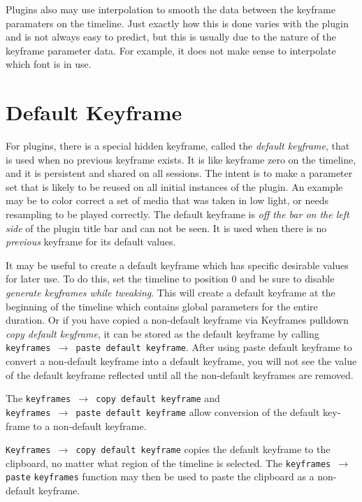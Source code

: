 Plugins also may use interpolation to smooth the data between the keyframe paramaters on the timeline.  Just exactly how this is done varies with the plugin and is not always easy to predict, but this
is usually due to the nature of the keyframe parameter data.  For example, it does not make sense to interpolate which font is in use.

\section{Default Keyframe}%
\label{sec:default_keyframe}

For plugins, there is a special hidden keyframe, called the \textit{default keyframe}, that is used when no previous keyframe exists.  It is like keyframe zero on the timeline, and it is persistent and shared on
all sessions.  The intent is to make a parameter set that is likely to be reused on all initial instances of the plugin.  An example may be to color correct a set of media that was taken in low light, or needs resampling to be played correctly.  The default keyframe is \textit{off the bar on the left side} of the plugin title bar and can not be seen.  It is used when there is no \textit{previous} keyframe for its default values.

It may be useful to create a default keyframe which has specific desirable values for later use.  To do this, set the timeline to position 0 and be sure to disable \textit{generate keyframes while tweaking}.  This will create a default keyframe at the beginning of the timeline which contains global parameters for the entire duration.  Or if you have copied a non-default keyframe via Keyframes pulldown \textit{copy default keyframe}, it can be stored as the default keyframe by calling \texttt{keyframes $\rightarrow$ paste default keyframe}.  After using paste default keyframe to convert a non-default keyframe into a default keyframe, you will not see the value of the default keyframe reflected until all the non-default keyframes are removed.

The \texttt{keyframes $\rightarrow$ copy default keyframe} and \\
\texttt{keyframes $\rightarrow$ paste default keyframe} allow conversion of the default key-frame to a non-default keyframe.

\texttt{Keyframes $\rightarrow$ copy default keyframe} copies the default keyframe to the clipboard, no matter what region of the timeline is selected.
The \texttt{keyframes $\rightarrow$ paste} \texttt{keyframes} function may then be used to paste the clipboard as a non-default keyframe.

